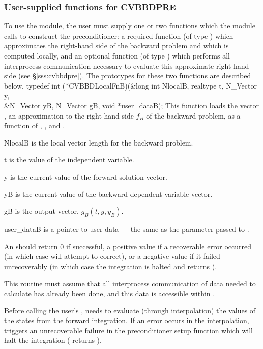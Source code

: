 \subsubsection{User-supplied functions for CVBBDPRE}
To use the {\cvbbdpre} module, the user must supply one or two functions which the
module calls to construct the preconditioner: a required function  
(of type ) which approximates the right-hand side of the backward
problem and which is computed locally, and an optional function  
(of type ) which performs all interprocess communication necessary 
to evaluate this approximate right-hand side (see \S\ref{sss:cvbbdpre}).
The prototypes for these two functions are described below.
{
  typedef int (*CVBBDLocalFnB)(&long int NlocalB, realtype t, N\_Vector y,\\
                               &N\_Vector yB, N\_Vector gB, void *user\_dataB);
}
{
  This  function loads the vector , an approximation to the
  right-hand side $f_B$ of the backward problem, as a function of , ,
  and .
}
{
  \begin{args}
  \item[NlocalB] 
    is the local vector length for the backward problem.
  \item[t]
    is the value of the independent variable.
  \item[y]
    is the current value of the forward solution vector.
  \item[yB]
    is the current value of the backward dependent variable vector.
  \item[gB]
    is the output vector, $g_B(t, y, y_B)$.
  \item[user\_dataB]
    is a pointer to user data --- the same as the       
    parameter passed to .  
  \end{args}
}
{
  An  should return 0 if successful, a positive value if a recoverable
  error occurred (in which case {\cvodes} will attempt to correct), or a negative 
  value if it failed unrecoverably (in which case the integration is halted and
   returns ). 
}
{
  This routine must assume that all interprocess communication of data needed to 
  calculate  has already been done, and this data is accessible within
  .

  {\warn}Before calling the user's , {\cvodes} needs to evaluate
  (through interpolation) the values of the states from the forward integration. 
  If an error occurs in the interpolation, {\cvodes} triggers an unrecoverable
  failure in the preconditioner setup function which will halt the integration
  ( returns ).
}
